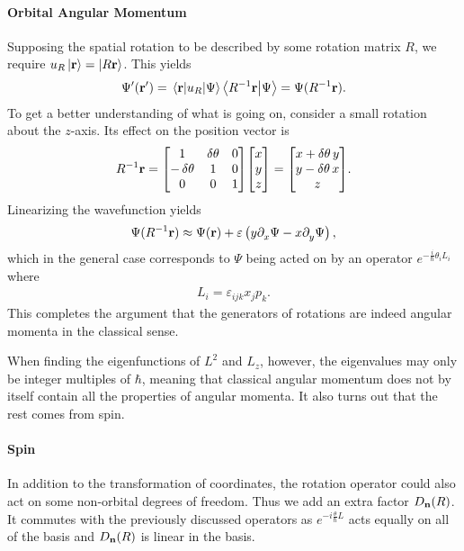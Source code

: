 \paragraph{Orbital Angular Momentum}
Supposing the spatial rotation to be described by some rotation matrix $R$, we require $u_{R}\ket{\vb{r}} = \ket{R\vb{r}}$. This yields
\begin{align*}
	\Psi^{\prime}(\vb{r}^{\prime}) = \mel{\vb{r}}{u_{R}}{\Psi} \braket{R^{-1}\vb{r}}{\Psi} = \Psi(R^{-1}\vb{r}).
\end{align*}
To get a better understanding of what is going on, consider a small rotation about the $z$-axis. Its effect on the position vector is
\begin{align*}
	R^{-1}\vb{r} =
	\mqty[
		1             & \var{\theta} & 0 \\
		-\var{\theta} & 1            & 0 \\
		0             & 0            & 1
	]
	\mqty[
		x \\
		y \\
		z \\
	] =
	\mqty[
		x + \var{\theta}y \\
		y - \var{\theta} x \\
		z
	].
\end{align*}
Linearizing the wavefunction yields
\begin{align*}
	\Psi(R^{-1}\vb{r}) \approx \Psi(\vb{r}) + \varepsilon\left(y\partial_{x}^{}\Psi - x\partial_{y}^{}\Psi\right),
\end{align*}
which in the general case corresponds to $\Psi$ being acted on by an operator $e^{-\frac{i}{\hbar}\theta_{i}L_{i}}$ where
\begin{align*}
	L_{i} = \varepsilon_{ijk}x_{j}p_{k}.
\end{align*}
This completes the argument that the generators of rotations are indeed angular momenta in the classical sense.

When finding the eigenfunctions of $L^{2}$ and $L_{z}$, however, the eigenvalues may only be integer multiples of $\hbar$, meaning that classical angular momentum does not by itself contain all the properties of angular momenta. It also turns out that the rest comes from spin.

\paragraph{Spin}
In addition to the transformation of coordinates, the rotation operator could also act on some non-orbital degrees of freedom. Thus we add an extra factor $D_{\vb{n}}(R)$. It commutes with the previously discussed operators as $e^{-i\frac{\theta}{\hbar}L}$ acts equally on all of the basis and $D_{\vb{n}}(R)$ is linear in the basis.

